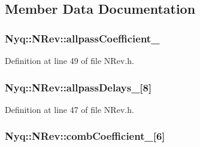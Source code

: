 \subsection{Member Data Documentation}
\subsubsection[{\texorpdfstring{allpass\+Coefficient\+\_\+}{allpassCoefficient_}}]{ Nyq\+::\+N\+Rev\+::allpass\+Coefficient\+\_\+\hspace{0.3cm}{\ttfamily [protected]}}\hypertarget{class_nyq_1_1_n_rev_a55b4448542b083a24e53bdcea85460cc}{}\label{class_nyq_1_1_n_rev_a55b4448542b083a24e53bdcea85460cc}


Definition at line 49 of file N\+Rev.\+h.

\subsubsection[{\texorpdfstring{allpass\+Delays\+\_\+}{allpassDelays_}}]{ Nyq\+::\+N\+Rev\+::allpass\+Delays\+\_\+\mbox{[}8\mbox{]}\hspace{0.3cm}{\ttfamily [protected]}}\hypertarget{class_nyq_1_1_n_rev_ad10639e7e0e68eab02687d764acca17a}{}\label{class_nyq_1_1_n_rev_ad10639e7e0e68eab02687d764acca17a}


Definition at line 47 of file N\+Rev.\+h.

\subsubsection[{\texorpdfstring{comb\+Coefficient\+\_\+}{combCoefficient_}}]{ Nyq\+::\+N\+Rev\+::comb\+Coefficient\+\_\+\mbox{[}6\mbox{]}\hspace{0.3cm}{\ttfamily [protected]}}\hypertarget{class_nyq_1_1_n_rev_a18661b19e8b2a7205be19068a5a7f395}{}\label{class_nyq_1_1_n_rev_a18661b19e8b2a7205be19068a5a7f395}


